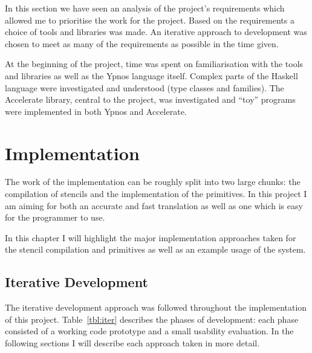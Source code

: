 \documentclass[
    12pt,
    a4paper,
    twoside,
    openright,
    ]{scrbook}
\begin{document}
In this section we have seen an analysis of the project's requirements which
allowed me to prioritise the work for the project. Based on the requirements a
choice of tools and libraries was made. An iterative approach to development was
chosen to meet as many of the requirements as possible in the time given.

At the beginning of the project, time was spent on familiarisation with the
tools and libraries as well as the Ypnos language itself. Complex parts of the
Haskell language were investigated and understood (type classes and
families). The Accelerate library, central to the project, was investigated and
``toy'' programs were implemented in both Ypnos and Accelerate.

\chapter{Implementation}
\label{chap:impl}

The work of the implementation can be roughly split into two large chunks: the
compilation of stencils and the implementation of the primitives. In this
project I am aiming for both an accurate and fast translation as well as one
which is easy for the programmer to use.

In this chapter I will highlight the major implementation approaches taken for
the stencil compilation and primitives as well as an example usage of the
system.

\section{Iterative Development}

The iterative development approach was followed throughout the implementation of
this project. Table~\ref{tbl:iter} describes the phases of development: each
phase consisted of a working code prototype and a small usability evaluation. In
the following sections I will describe each approach taken in more detail.
\end{document}
